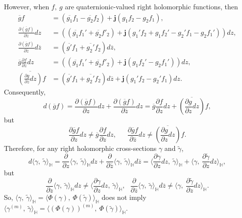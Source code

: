 \documentclass[pdflatex,sn-mathphys-num]{sn-jnl}%
\theoremstyle{thmstyleone}%
\theoremstyle{thmstyletwo}%
\theoremstyle{thmstylethree}%
\theoremstyle{definition}
\theoremstyle{remark}
\begin{document}
    However, when $f,\ g$ are quaternionic-valued right holomorphic functions, then
    $$\begin{aligned}
    \overline{g}f&=(\overline{g_1}f_1-\overline{g_2}f_2)+\boldsymbol{j}(g_1f_2-g_2f_1), \\
    \frac{\partial (\overline{g}f)}{\partial z}dz & =((\overline{g_1}f_1'+\overline{g_2}f'_2)+\boldsymbol{j}(g_1'f_2+g_1f_2'-g_2'f_1-g_2f_1'))dz, \\
    \frac{\partial (\overline{g}f)}{\partial \overline{z}}d\overline{z} & =(\overline{g'}f_1+\overline{g_2'}f_2)d\overline{z}, \\
    \overline{g}\frac{\partial f}{\partial z}dz & =((\overline{g_1}f_1'+\overline{g_2}f'_2)+\boldsymbol{j}(g_1f_2'-g_2f_1'))dz ,  \\
    \overline{(\frac{\partial g}{\partial z}dz)}
    f & =(\overline{g'}f_1+\overline{g_2'}f_2)d\overline{z}+\boldsymbol{j}(g_1'f_2
    -g_2'f_1)dz.
    \end{aligned}$$
    Consequently,
    $$
    d (\overline{g}f)=\frac{\partial (\overline{g}f)}{\partial z}dz+\frac{\partial (\overline{g}f)}{\partial \overline{z}}dz =
    \overline{g}\frac{\partial f}{\partial z}dz+\overline{(\frac{\partial g}{\partial z}dz)}f,
    $$
    but
    $$
    \frac{\partial \overline{g}f}{\partial z}dz\ne \overline{g}\frac{\partial f}{\partial z}dz,\ \ \ \ \ \ \
    \frac{\partial \overline{g}f}{\partial \overline{z}}dz\ne \overline{(\frac{\partial g}{\partial z}dz)}f.
    $$
Therefore, for any right holomorphic cross-sections $\gamma$ and $\widetilde{\gamma}$,
    \begin{equation}\label{TDiff}
    d\langle\gamma, \ \widetilde{\gamma}\rangle_{\mathbb{H}}=\frac{\partial}{\partial z}\langle\gamma, \ \widetilde{\gamma}\rangle_{\mathbb{H}}dz+\frac{\partial}{\partial\overline{z}}\langle\gamma, \ \widetilde{\gamma}\rangle_{\mathbb{H}}d\overline{z}=\langle\frac{\partial\gamma}{\partial z} dz, \ \widetilde{\gamma}\rangle_{\mathbb{H}}+\langle\gamma, \ \frac{\partial\widetilde{\gamma}}{\partial z}dz\rangle_{\mathbb{H}},
     \end{equation}
    but
    $$
\frac{\partial}{\partial z}\langle\gamma, \ \widetilde{\gamma}\rangle_{\mathbb{H}}dz\neq \langle\frac{\partial\gamma}{\partial z} dz, \ \widetilde{\gamma}\rangle_{\mathbb{H}}, \ \ \  \frac{\partial}{\partial\overline{z}}\langle\gamma, \ \widetilde{\gamma}\rangle_{\mathbb{H}}d\overline{z}\neq \langle\gamma, \ \frac{\partial\widetilde{\gamma}}{\partial z}dz\rangle_{\mathbb{H}}.
$$
So,  $\langle \gamma,\ \widetilde{\gamma}\rangle_{\mathbb{H}}=\langle\Phi(\gamma),\ \Phi(\widetilde{\gamma}) \rangle_{\mathbb{H}}$ does not imply $\langle \gamma^{(m)},\ \widetilde{\gamma}\rangle_{\mathbb{H}}=\langle(\Phi(\gamma))^{(m)},\ \Phi(\widetilde{\gamma}) \rangle_{\mathbb{H}}$.
\end{document}
